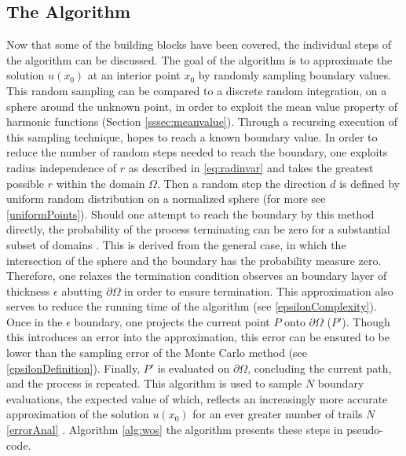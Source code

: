 \subsection{The Algorithm}\label{sssec:algorithm} %
Now that some of the building blocks have been covered, the individual steps of
the algorithm can be discussed.  The goal of the algorithm is to approximate
the solution $u(x_{0})$ at an interior point $x_{0}$ by randomly sampling boundary
values.  This random sampling can be compared to a discrete random integration,
on a sphere around the unknown point, in order to exploit the mean value property
of harmonic functions (Section \ref{sssec:meanvalue}).  Through a recursing execution of this sampling
technique, hopes to reach a known boundary value.
In order to reduce the number of random steps needed to reach the boundary,
one exploits radius independence of $r$ as described in \eqref{eq:radinvar} and takes
the greatest possible $r$ within the domain $\Omega$.  Then a random step  the direction $d$
is defined by uniform random distribution on a normalized sphere (for more see \ref{uniformPoints}).
Should one attempt to reach the boundary by this method directly, the probability of the
process terminating can be zero for a substantial subset of domains \cite{kakutani1944, DeLaurentis, Bornemann}.
This is derived from the general case, in which the intersection of the sphere and
the boundary has the probability measure zero. Therefore, one relaxes the
termination condition observes an boundary layer of thickness $\epsilon$ abutting
$\partial \Omega$ in order to ensure termination. This approximation also
serves to reduce the running time of the algorithm (see \ref{epsilonComplexity}). Once in the $\epsilon$
boundary, one projects the current point $P$ onto $\partial \Omega$ ($P'$).  Though this
introduces an error into the approximation, this error can be ensured to be lower than
the sampling error of the Monte Carlo method (see \ref{epsilonDefinition}).  Finally,
$P'$ is evaluated on $\partial \Omega$, concluding the current path, and the process
is repeated.
This algorithm is used to sample $N$ boundary evaluations, the expected value of which,
reflects an increasingly more accurate approximation of the solution $u(x_{0})$
for an ever greater number of trails $N$ \ref{errorAnal} \cite{Bornemann,DeLaurentis}.
  Algorithm \ref{alg:wos} the algorithm presents these steps in pseudo-code.

